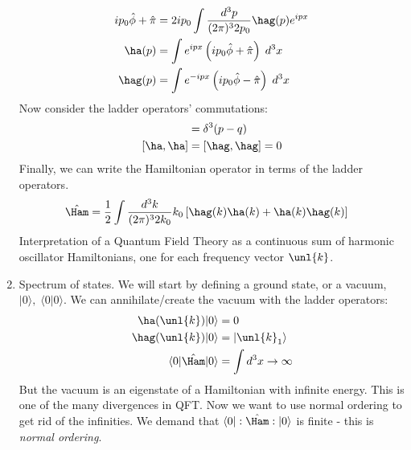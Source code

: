 \documentclass[a4paper, 11pt, normalem]{report}
\newcommand\hphi{\hat{\phi}}
\newcommand\hpi{\hat{\pi}}
\begin{document}
\begin{enumerate}
\begin{align}
            ip_0\hphi + \hpi &= 2ip_0 \int\frac{d^3p}{(2\pi)^32p_0} \hag(p)e^{ipx} \\
            \ha(p) &= \int e^{ipx}\left(ip_0\hphi + \hpi\right)\;d^3x \\
            \hag(p) &= \int e^{-ipx}\left(ip_0\hphi - \hpi\right)\;d^3x
        \end{align}
        Now consider the ladder operators' commutations:
        \begin{align}
            [\ha(p),\hag(q)] &= \delta^3(p-q) \\
            [\ha,\ha] &= [\hag,\hag] = 0
        \end{align}
        Finally, we can write the Hamiltonian operator in terms of the ladder operators. 
        \begin{align}
            \hat{\Ham} &= \frac12 \int \frac{d^3k}{(2\pi)^32k_0} k_0\left[\hag(k)\ha(k) + \ha(k)\hag(k)\right]
        \end{align}
        Interpretation of a Quantum Field Theory as a continuous sum of harmonic oscillator Hamiltonians, one for each frequency vector $\unl{k}$.
    \item Spectrum of states. 
        We will start by defining a ground state, or a vacuum, $|0\rangle,\;\langle0|0\rangle$.
        We can annihilate/create the vacuum with the ladder operators:
        \begin{align}
            \ha(\unl{k})|0\rangle &= 0 \\
            \hag(\unl{k})|0\rangle &= |\unl{k}_1\rangle \\
            \langle0|\hat{\Ham}|0\rangle &= \int d^3x \to \infty
        \end{align}
        But the vacuum is an eigenstate of a Hamiltonian with infinite energy. 
        This is one of the many divergences in QFT.
        Now we want to use normal ordering to get rid of the infinities. 
        We demand that $\langle0|:\hat{\Ham}:|0\rangle$ is finite - this is \textit{normal ordering}. 
\end{enumerate}
\end{document}
